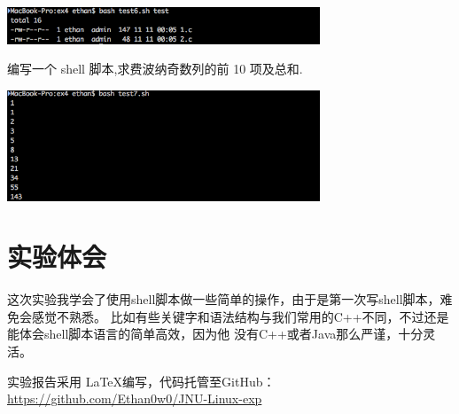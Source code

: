 \documentclass{JNUexp}
\begin{document}
\begin{image}
    \begin{center}
        \includegraphics[width=0.7\textwidth]{5}
    \end{center}
\end{image}
\begin{problem}
    编写一个 shell 脚本,求费波纳奇数列的前 10 项及总和.
\end{problem}

\begin{answer}
    
\end{answer}

\begin{image}
    \begin{center}
        \includegraphics[width=0.7\textwidth]{6}
    \end{center}
\end{image}


\section{实验体会}

这次实验我学会了使用shell脚本做一些简单的操作，由于是第一次写shell脚本，难免会感觉不熟悉。
比如有些关键字和语法结构与我们常用的C++不同，不过还是能体会shell脚本语言的简单高效，因为他
没有C++或者Java那么严谨，十分灵活。\\
\vspace{50pt}

实验报告采用 \LaTeX 编写，代码托管至GitHub：\\
\url{https://github.com/Ethan0w0/JNU-Linux-exp}
\end{document}
